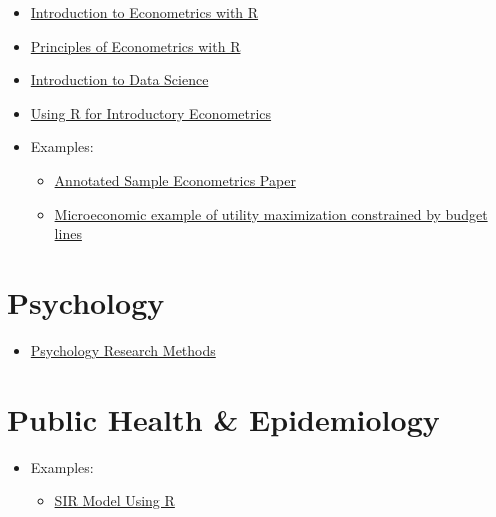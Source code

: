 \documentclass[]{book}
\providecommand{\tightlist}{%
  \setlength{\itemsep}{0pt}\setlength{\parskip}{0pt}}
\begin{document}
\begin{itemize}
\item
  \href{https://www.econometrics-with-r.org}{Introduction to Econometrics with R}
\item
  \href{https://bookdown.org/ccolonescu/RPoE4/}{Principles of Econometrics with R}
\item
  \href{https://bookdown.org/ronsarafian/IntrotoDS/}{Introduction to Data Science}
\item
  \href{http://www.urfie.net/read.html}{Using R for Introductory Econometrics}
\item
  Examples:

  \begin{itemize}
  \item
    \href{https://minerva.union.edu/dvorakt/43/sample_paper.htm}{Annotated Sample Econometrics Paper}
  \item
    \href{https://www.andrewheiss.com/blog/2019/02/16/algebra-calculus-r-yacas/}{Microeconomic example of utility maximization constrained by budget lines}
  \end{itemize}
\end{itemize}

\hypertarget{psychology}{%
\section*{Psychology}\label{psychology}}

\begin{itemize}
\tightlist
\item
  \href{https://www.simplypsychology.org/qualitative-quantitative.html}{Psychology Research Methods}
\end{itemize}

\hypertarget{public-health-epidemiology}{%
\section*{Public Health \& Epidemiology}\label{public-health-epidemiology}}

\begin{itemize}
\item
  Examples:

  \begin{itemize}
  \tightlist
  \item
    \href{https://rpubs.com/choisy/sir}{SIR Model Using R}
  \end{itemize}
\end{itemize}
\end{document}
